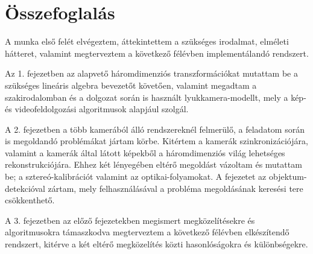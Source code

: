 \chapter{Összefoglalás}

A munka első felét elvégeztem, áttekintettem a szükséges irodalmat, elméleti hátteret, valamint megterveztem a következő félévben implementálandó rendszert.

Az 1. fejezetben az alapvető háromdimenziós transzformációkat mutattam be a szükséges lineáris algebra bevezetőt követően, valamint megadtam a szakirodalomban és a dolgozat során is használt lyukkamera-modellt, mely a kép- és videofeldolgozási algoritmusok alapjául szolgál.

A 2. fejezetben a több kamerából álló rendszereknél felmerülő, a feladatom során is megoldandó problémákat jártam körbe. Kitértem a kamerák szinkronizációjára, valamint a kamerák által látott képekből a háromdimenziós világ lehetséges rekonstrukciójára. Ehhez két lényegében eltérő megoldást vázoltam és mutattam be; a sztereó-kalibrációt valamint az optikai-folyamokat. A fejezetet az objektum-detekcióval zártam, mely felhasználásával a probléma megoldásának keresési tere csökkenthető.

A 3. fejezetben az előző fejezetekben megismert megközelítésekre és algoritmusokra támaszkodva megterveztem a következő félévben elkészítendő rendszert, kitérve a két eltérő megközelítés közti hasonlóságokra és különbségekre.